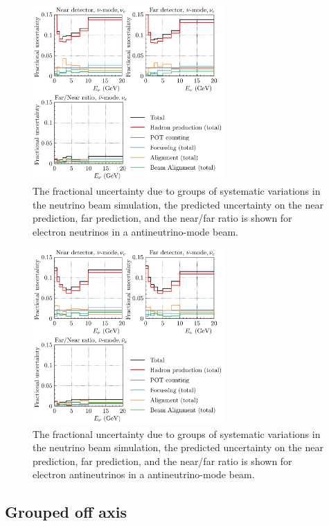 \documentclass{article}
\begin{document}
\begin{figure}
  \centering
  \includegraphics[width=0.65\textwidth]{plots/fracerrs/nubarmode_nue_ErrType}
  \caption{The fractional uncertainty due to groups of systematic variations in the neutrino beam simulation, the predicted uncertainty on the near prediction, far prediction, and the near/far ratio is shown for electron neutrinos in a antineutrino-mode beam.}
  \label{fig:grp_nubar_nue}
\end{figure}

\begin{figure}
  \centering
  \includegraphics[width=0.65\textwidth]{plots/fracerrs/nubarmode_nuebar_ErrType}
  \caption{The fractional uncertainty due to groups of systematic variations in the neutrino beam simulation, the predicted uncertainty on the near prediction, far prediction, and the near/far ratio is shown for electron antineutrinos in a antineutrino-mode beam.}
  \label{fig:grp_nubar_nuebar}
\end{figure}

\subsection{Grouped off axis}
\end{document}
